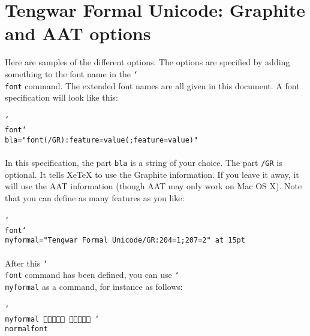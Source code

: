 \documentclass[11pt,a4paper]{article}
\begin{document}
\section{Tengwar Formal Unicode: Graphite and AAT options}

Here are samples of the different options. The options are specified by adding something to the font name in the \texttt{\char`\\font} command. The extended font names are all given in this document. A font specification will look like this:

\paragraph{} \texttt{\char`\\font\char`\\bla="font(/GR):feature=value(;feature=value)"}

\paragraph{} In this specification, the part \texttt{bla} is a string of your choice. The part \texttt{/GR} is optional. It tells Xe\TeX{} to use the Graphite information. If you leave it away, it will use the AAT information (though AAT may only work on Mac OS X). Note that you can define as many features as you like:

\paragraph{} \texttt{\char`\\font\char`\\myformal="Tengwar Formal Unicode/GR:204=1;207=2" at 15pt}

\paragraph{} After this \texttt{\char`\\font} command has been defined, you can use \texttt{\char`\\myformal} as a command, for instance as follows:

\paragraph{} \texttt{\char`\\myformal   \char`\\normalfont}
\end{document}
